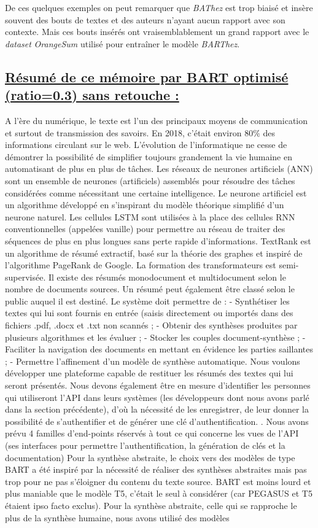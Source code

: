 De ces quelques exemples on peut remarquer que \textit{BAThez} est trop biaisé et insère souvent des bouts de textes et des auteurs n'ayant aucun rapport avec son contexte. Mais ces bouts insérés ont vrai\-sem\-bla\-ble\-ment un grand rapport avec le \textit{dataset} \textit{OrangeSum} utilisé pour entraîner le modèle \textit{BARThez}.
\subsection*{\underline{Résumé de ce mémoire par BART optimisé (ratio=0.3) sans retouche :}}
A l'ère du numérique, le texte est l'un des principaux moyens de communication et surtout de transmission des savoirs. En 2018, c'était environ $ 80\% $ des informations circulant sur le web. L'évolution de l'informatique ne cesse de démontrer la possibilité de simplifier toujours grandement la vie humaine en automatisant de plus en plus de tâches. Les réseaux de neurones artificiels (ANN) sont un ensemble de neurones (artificiels) assemblés pour résoudre des tâches considérées comme nécessitant une certaine intelligence. Le neurone artificiel est un algorithme développé en s'inspirant du modèle théorique simplifié d'un neurone naturel. Les cellules LSTM sont utilisées à la place des cellules RNN con\-ven\-tion\-nelles (appelées vanille) pour permettre au réseau de traiter des séquences de plus en plus longues sans perte rapide d'informations. TextRank est un algorithme de résumé extractif, basé sur la théorie des graphes et inspiré de l'algorithme PageRank de Google. La formation des transformateurs est semi-supervisée. Il existe des résumés mono\-document et multi\-do\-cu\-ment selon le nombre de documents sources. Un résumé peut également être classé selon le public auquel il est destiné. Le système doit permettre de : - Synthétiser les textes qui lui sont fournis en entrée (saisis directement ou importés dans des fichiers .pdf, .docx et .txt non scannés ; - Obtenir des synthèses produites par plusieurs algorithmes et les évaluer ; - Stocker les couples document-synthèse ; - Faciliter la navigation des documents en mettant en évidence les parties saillantes ; - Permettre l'affinement d'un modèle de synthèse automatique. Nous voulons développer une plateforme capable de restituer les résumés des textes qui lui seront présentés. Nous devons également être en mesure d'identifier les personnes qui utiliseront l'API dans leurs systèmes (les développeurs dont nous avons parlé dans la section précédente), d'où la nécessité de les enregistrer, de leur donner la possibilité de s'authentifier et de générer une clé d'authentification. . Nous avons prévu 4 familles d'end-points réservés à tout ce qui concerne les vues de l'API (ses interfaces pour permettre l'authentification, la génération de clés et la documentation) Pour la synthèse abstraite, le choix vers des modèles de type BART a été inspiré par la nécessité de réaliser des synthèses abstraites mais pas trop pour ne pas s'éloigner du contenu du texte source. BART est moins lourd et plus maniable que le modèle T5, c'était le seul à considérer (car PEGASUS et T5 étaient ipso facto exclus). Pour la synthèse abstraite, celle qui se rapproche le plus de la synthèse humaine, nous avons utilisé des modèles 